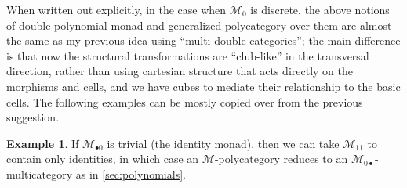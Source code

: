 \documentclass{article}
\theoremstyle{definition}
\newtheorem{eg}[thm]{Example}
\theoremstyle{remark}
\def\M{\mathcal{M}}
\def\Mh{\M_{\bullet 0}}
\def\Mv{\M_{0\bullet}}
\begin{document}
When written out explicitly, in the case when $\M_0$ is discrete, the above notions of double polynomial monad and generalized polycategory over them are almost the same as my previous idea using ``multi-double-categories''; the main difference is that now the structural transformations are ``club-like'' in the transversal direction, rather than using cartesian structure that acts directly on the morphisms and cells, and we have cubes to mediate their relationship to the basic cells.
The following examples can be mostly copied over from the previous suggestion.

\begin{eg}\label{eg:degenerate}
  If $\Mh$ is trivial (the identity monad), then we can take $\M_{11}$ to contain only identities, in which case an $\M$-polycategory reduces to an $\Mv$-multicategory as in \cref{sec:polynomials}.
\end{eg}
\end{document}
